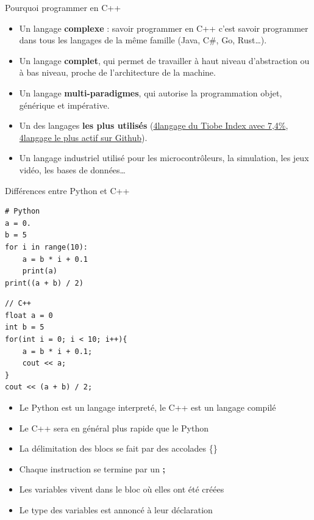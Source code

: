 \begin{frame}{Pourquoi programmer en C++}
    \begin{itemize}[<+->]
        \item Un langage \textbf{complexe} : savoir programmer en C++ c'est savoir programmer dans tous les langages de la même famille (Java, C\#, Go, Rust\dots).
        \item Un langage \textbf{complet}, qui permet de travailler à haut niveau d'abstraction ou à bas niveau, proche de l'architecture de la machine.
        \item Un langage \textbf{multi-paradigmes}, qui autorise la programmation objet, générique et impérative.
        \item Un des langages \textbf{les plus utilisés} (\href{https://www.tiobe.com/tiobe-index/}{4\ieme langage du Tiobe Index avec 7,4\%}, \href{https://www.developpez.com/actu/185087/Quels-sont-les-langages-de-programmation-les-plus-utilises-par-les-developpeurs-Une-analyse-des-evenements-publics-sur-GitHub/}{4\ieme langage le plus actif sur Github}).
        \item Un langage industriel utilisé pour les microcontrôleurs, la simulation, les jeux vidéo, les bases de données\dots
    \end{itemize}
\end{frame}

\begin{frame}[fragile]{Différences entre Python et C++}
	\begin{minipage}{0.45\linewidth}
		\begin{verbatim}
# Python
a = 0.
b = 5
for i in range(10):
    a = b * i + 0.1
    print(a)
print((a + b) / 2)
		\end{verbatim}
	\end{minipage}
	\hfill
	\begin{minipage}{0.45\linewidth}
		\begin{verbatim}
// C++
float a = 0
int b = 5
for(int i = 0; i < 10; i++){
    a = b * i + 0.1;
    cout << a;
}
cout << (a + b) / 2;
		\end{verbatim}
	\end{minipage}

	\begin{itemize}[<+->]
		\item Le Python est un langage interpreté, le C++ est un langage compilé
		\item Le C++ sera en général plus rapide que le Python
		\item La délimitation des blocs se fait par des accolades {\Large \{\}}
		\item Chaque instruction se termine par un {\huge\textbf{;}} \uncover<4->{\textcolor{red}{$\leftarrow$ indispensable}}
		\item Les variables vivent dans le bloc où elles ont été créées
		\item Le type des variables est annoncé à leur déclaration
	\end{itemize}
\end{frame}



